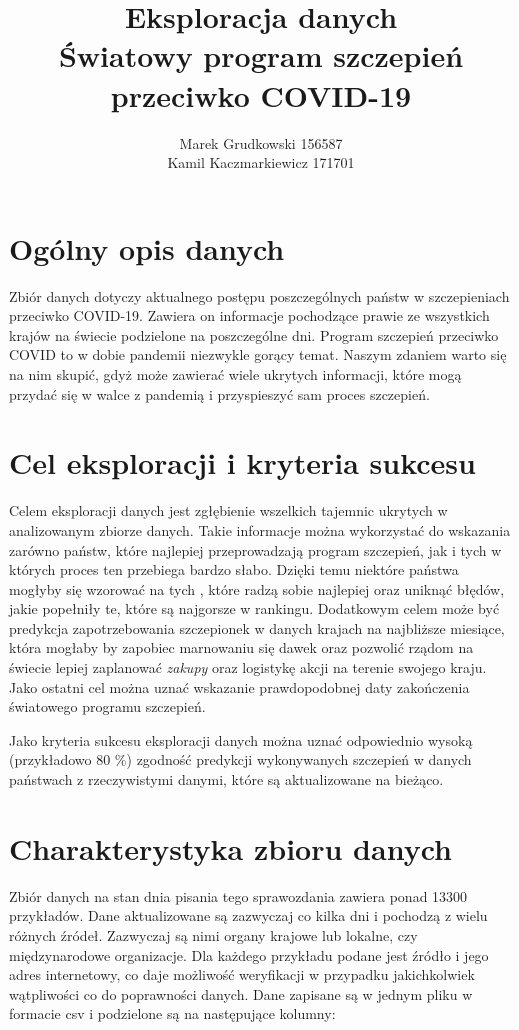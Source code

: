 \documentclass[12pt, oneside]{article}
\title{
	Eksploracja danych \\
	Światowy program szczepień przeciwko COVID-19
}
\author{
	Marek Grudkowski 156587
	\\
	Kamil Kaczmarkiewicz 171701
}
\begin{document}
\maketitle

\section{Ogólny opis danych}

Zbiór danych dotyczy aktualnego postępu poszczególnych państw w szczepieniach przeciwko COVID-19. Zawiera on informacje pochodzące prawie ze wszystkich krajów na świecie podzielone na poszczególne dni. Program szczepień przeciwko COVID to w dobie pandemii niezwykle gorący temat. Naszym zdaniem warto się na nim skupić, gdyż może zawierać wiele ukrytych informacji, które mogą przydać się w walce z pandemią i przyspieszyć sam proces szczepień. 

\section{Cel eksploracji i kryteria sukcesu}

Celem eksploracji danych jest zgłębienie wszelkich tajemnic ukrytych w analizowanym zbiorze danych. Takie informacje można wykorzystać do wskazania zarówno państw, które najlepiej przeprowadzają program szczepień, jak i tych w których proces ten przebiega bardzo słabo. Dzięki temu niektóre państwa mogłyby się wzorować na tych , które radzą sobie najlepiej oraz uniknąć błędów, jakie popełniły te, które są najgorsze w rankingu. Dodatkowym celem może być predykcja zapotrzebowania szczepionek w danych krajach na najbliższe miesiące, która mogłaby by zapobiec marnowaniu się dawek oraz pozwolić rządom na świecie lepiej zaplanować \textit{zakupy} oraz logistykę akcji na terenie swojego kraju.  Jako ostatni cel można uznać wskazanie prawdopodobnej daty zakończenia światowego programu szczepień. 
\par
Jako kryteria sukcesu eksploracji danych można uznać odpowiednio wysoką (przykładowo $80$ \%) zgodność predykcji wykonywanych szczepień w danych państwach z rzeczywistymi danymi, które są aktualizowane na bieżąco. 

\newpage

\section{Charakterystyka zbioru danych}
Zbiór danych na stan dnia pisania tego sprawozdania zawiera ponad 13300 przykładów. Dane aktualizowane są zazwyczaj co kilka dni i pochodzą z wielu różnych źródeł. Zazwyczaj są nimi organy krajowe lub lokalne, czy międzynarodowe organizacje. Dla każdego przykładu podane jest źródło i jego adres internetowy, co daje możliwość weryfikacji w przypadku jakichkolwiek wątpliwości co do poprawności danych. Dane zapisane są w jednym pliku w formacie csv i podzielone są na następujące kolumny:
\end{document}
